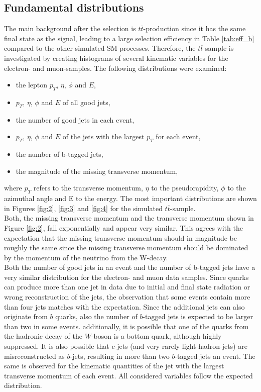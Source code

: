 \subsection{Fundamental distributions} \label{sec:sekunde}
The main background after the selection is $t \overline{t}$-production since it has the same final state as the signal, leading to a large selection efficiency
in Table \ref{tab:eff_b} compared to the other simulated SM processes.
Therefore, the $t \overline{t}$-sample is investigated by creating
histograms of several kinematic variables for the electron- and muon-samples.
The following distributions were examined:
\begin{itemize}
  \item the lepton $p_T$, $\eta$, $\phi$ and $E$,
  \item $p_T$, $\eta$, $\phi$ and $E$ of all good jets,
  \item the number of good jets in each event,
  \item $p_T$, $\eta$, $\phi$ and $E$ of the jets with the largest $p_T$ for each event,
  \item the number of b-tagged jets,
  \item the magnitude of the missing transverse momentum,
\end{itemize}
where $p_T$ refers to the transverse momentum, $\eta$ to the pseudorapidity, $\phi$ to the azimuthal angle and E to the energy.
The most important distributions are shown in Figures \ref{fig:2}, \ref{fig:3} and \ref{fig:4} for the simulated $t\overline{t}$-sample. \\
Both, the missing transverse momentum and the transverse momentum shown in Figure \ref{fig:2}, fall exponentially and appear very similar.
This agrees with the expectation that the missing transverse momentum should in magnitude be roughly the same since the missing
transverse momentum should be dominated by the momentum of the neutrino from the W-decay. \\
Both the number of good jets in an event and the number of b-tagged jets have a very similar distribution for the electron- and muon data samples.
Since quarks can produce more than one jet in data due to initial and final state radiation or wrong reconstruction of the jets, the observation that some
events contain more than four jets matches with the expectation.
Since the additional jets can also originate from $b$ quarks, also the number of $b$-tagged jets is expected to be larger than two in some events.
additionally, it is possible that one of the quarks from the hadronic decay of the $W$-boson is a bottom quark, although highly suppressed.
It is also possible that $c$-jets (and very rarely light-hadron-jets) are misreconstructed as $b$-jets, resulting in more than two $b$-tagged jets an event.
The same is observed for the kinematic quantities of the jet with the largest transverse momentum of each event. All considered variables follow
the expected distribution.

